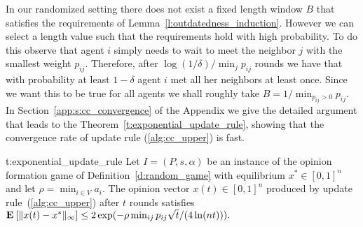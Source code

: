 In our randomized setting there does not exist a fixed length window $B$
that satisfies the requirements of Lemma~\ref{l:outdatedness_induction}.
However we can select a length value such that the requirements hold with high probability.
To do this observe that agent $i$ simply needs to wait to meet the neighbor
$j$ with the smallest weight $p_{ij}$. Therefore, after
$\log(1/\delta)/\min_{j} p_{ij}$ rounds we have that with probability at least
$1-\delta$ agent $i$ met all her neighbors at least once.
Since we want this to be true for all agents
we shall roughly take $B = 1/\min_{p_{ij} > 0} {p_{ij}}$.
In Section~\ref{app:s:cc_convergence} of the Appendix we give the detailed
argument that leads to the Theorem~\ref{t:exponential_update_rule},
showing that the convergence rate of update rule (\ref{alg:cc_upper}) is fast.

\begin{reptheorem}{t:exponential_update_rule}
  Let $I = (P,s, \alpha)$ be an instance of the opinion formation
  game of Definition~\ref{d:random_game} with equilibrium
  $x^* \in [0,1]^n$ and let $\rho = \min_{i \in V} a_i$.
  The opinion vector $x(t)\in[0,1]^n$ produced by
  update rule~(\ref{alg:cc_upper}) after $t$ rounds satisfies
  \(
    \Exp{\norm{\infty}{x(t) - x^*}}
    \leq
    2\exp(- \rho  \min_{ij} p_{ij} \sqrt{t}/(4\ln(nt)) ).
  \)
\end{reptheorem}
